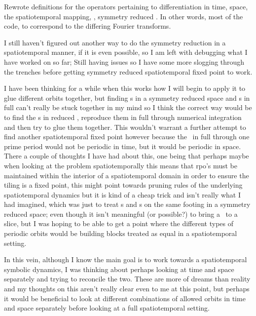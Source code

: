 \begin{description}
{Rewrote definitions for the operators pertaining to differentiation in
time, space, the spatiotemporal mapping,  \jacobianM, symmetry reduced
\jacobianM. In other words, most of the code, to correspond to the
differing Fourier transforms.

I still haven't figured out another way to do the symmetry reduction in a spatiotemporal manner,
if it is even possible, so I am
left with debugging what I have worked on so far; Still having issues so I have some more slogging
through the trenches before getting symmetry reduced spatiotemporal fixed point to work.

I have been thinking for a while when this works how I will begin to apply it to glue different orbits together,
but finding {\rpo}s in a symmetry reduced space and {\ppo}s in full {\statesp} can't really be stuck together
in my mind so I think the correct way would be to find the {\rpo}s in reduced {\statesp}, reproduce
them in full {\statesp} through numerical integration and then try to glue them together. This wouldn't
warrant a further attempt to find another spatiotemporal fixed point however because the \rpo\ in full
{\statesp} through one prime period would not be periodic in time, but it would be periodic in space.
There a couple of thoughts I have had about this, one being that perhaps maybe when looking at the
problem spatiotemporally this means that rpo's must be maintained within the interior of a spatiotemporal
domain in order to ensure the tiling is a fixed point, this might point towards pruning rules of the underlying
spatiotemporal dynamics but it is kind of a cheap trick and isn't really what I had imagined, which was just
to treat {\ppo}s and {\rpo}s on the same footing in a symmetry reduced space; even though it isn't meaningful
(or possible?) to bring a \ppo\ to a slice, but I was hoping to be able to get a point where the different types
of periodic orbits would be building blocks treated as equal in a spatiotemporal setting.

In this vein, although I know the main goal is to work towards a spatiotemporal symbolic dynamics, I was
thinking about perhaps looking at time and space separately and trying to reconcile the two.
These are more of dreams than reality and my thoughts on this aren't really clear
even to me at this point, but perhaps it would be beneficial to look at different combinations of allowed
orbits in time and space separately before looking at a full spatiotemporal setting.

}
\end{description}
